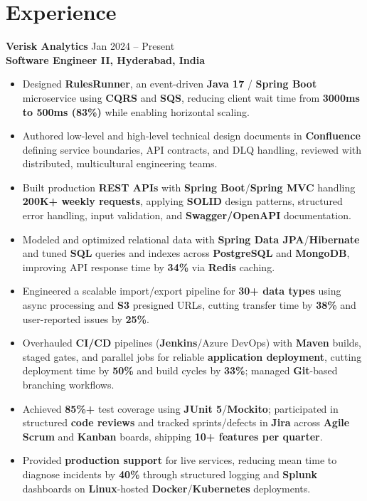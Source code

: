 \documentclass[a4paper,10pt]{article}
\begin{document}
\section*{Experience}

\textbf{Verisk Analytics} \hfill Jan 2024 -- Present \\
\textbf{Software Engineer II, Hyderabad, India}

\begin{itemize}[leftmargin=*]
    \item Designed \textbf{RulesRunner}, an event-driven \textbf{Java 17} / \textbf{Spring Boot} microservice using \textbf{CQRS} and \textbf{SQS}, reducing client wait time from \textbf{3000ms to 500ms (83\%)} while enabling horizontal scaling.
    \item Authored low-level and high-level technical design documents in \textbf{Confluence} defining service boundaries, API contracts, and DLQ handling, reviewed with distributed, multicultural engineering teams.
    \item Built production \textbf{REST APIs} with \textbf{Spring Boot}/\textbf{Spring MVC} handling \textbf{200K+ weekly requests}, applying \textbf{SOLID} design patterns, structured error handling, input validation, and \textbf{Swagger/OpenAPI} documentation.
    \item Modeled and optimized relational data with \textbf{Spring Data JPA}/\textbf{Hibernate} and tuned \textbf{SQL} queries and indexes across \textbf{PostgreSQL} and \textbf{MongoDB}, improving API response time by \textbf{34\%} via \textbf{Redis} caching.
    \item Engineered a scalable import/export pipeline for \textbf{30+ data types} using async processing and \textbf{S3} presigned URLs, cutting transfer time by \textbf{38\%} and user-reported issues by \textbf{25\%}.
    \item Overhauled \textbf{CI/CD} pipelines (\textbf{Jenkins}/Azure DevOps) with \textbf{Maven} builds, staged gates, and parallel jobs for reliable \textbf{application deployment}, cutting deployment time by \textbf{50\%} and build cycles by \textbf{33\%}; managed \textbf{Git}-based branching workflows.
    \item Achieved \textbf{85\%+} test coverage using \textbf{JUnit 5}/\textbf{Mockito}; participated in structured \textbf{code reviews} and tracked sprints/defects in \textbf{Jira} across \textbf{Agile Scrum} and \textbf{Kanban} boards, shipping \textbf{10+ features per quarter}.
    \item Provided \textbf{production support} for live services, reducing mean time to diagnose incidents by \textbf{40\%} through structured logging and \textbf{Splunk} dashboards on \textbf{Linux}-hosted \textbf{Docker}/\textbf{Kubernetes} deployments.
\end{itemize}
\end{document}

